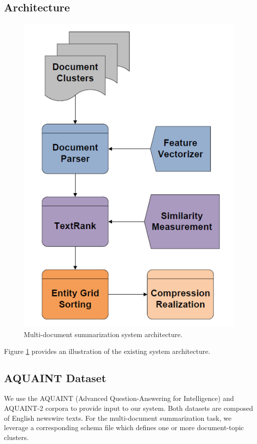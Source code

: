 \documentclass[11pt]{article}
\begin{document}
\subsection{Architecture}
\begin{figure}
  \includegraphics[width=.9\linewidth,height=.25\textheight,keepaspectratio]{arch_final.png}
  \caption{Multi-document summarization system architecture.}
  \label{fig:arch}
\end{figure}

Figure \ref{fig:arch} provides an illustration of the existing system architecture.

\subsection{AQUAINT Dataset}
We use the AQUAINT (Advanced Question-Answering for Intelligence) and AQUAINT-2 corpora to provide input to our system. Both datasets are composed of English newswire texts. For the multi-document summarization task, we leverage a corresponding schema file which defines one or more document-topic clusters. 
\end{document}
